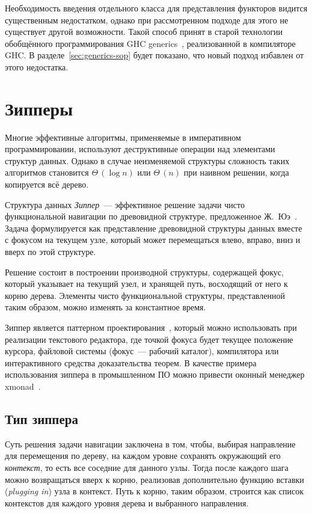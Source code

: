 Необходимость введения отдельного класса для представления
функторов видится существенным недостатком, однако при
рассмотренном подходе для этого не существует другой возможности.
Такой способ принят в старой технологии обобщённого
программирования \textsf{GHC generics}~\cite{ghc-generics},
реализованной в компиляторе \textsf{GHC}. В
разделе~\ref{sec:generics-sop} будет показано, что новый подход
избавлен от этого недостатка.

\section{Зипперы}
\label{sec:zippers}

Многие эффективные алгоритмы, применяемые в императивном программировании, используют деструктивные операции над элементами структур данных. Однако в случае неизменяемой структуры сложность таких алгоритмов становится $\Theta\,(\log n)$ или $\Theta\,(n)$ при наивном решении, когда копируется всё дерево.

Структура данных \emph{Зиппер}~--- эффективное решение задачи чисто функциональной навигации по древовидной структуре, предложенное Ж.~Юэ~\cite{Hue1997}. Задача формулируется как представление древовидной структуры данных вместе с фокусом на текущем узле, который может перемещаться влево, вправо, вниз и вверх по этой структуре.

Решение состоит в построении производной структуры, содержащей фокус, который указывает на текущий узел, и хранящей путь, восходящий от него к корню дерева. Элементы чисто функциональной структуры, представленной таким образом, можно изменять за константное время.

Зиппер является паттерном проектирования~\cite{Ad2010}, который можно использовать при реализации текстового редактора, где точкой фокуса будет текущее положение курсора, файловой системы (фокус~--- рабочий каталог), компилятора или интерактивного средства доказательства теорем. В качестве примера использования зиппера в промышленном ПО можно привести оконный менеджер \textsf{xmonad}~\cite{xmonad}.

\subsection{Тип зиппера}

Суть решения задачи навигации заключена в том, чтобы, выбирая направление для перемещения по дереву, на каждом уровне сохранять окружающий его \emph{контекст}, то есть все соседние для данного узлы. Тогда после каждого шага можно возвращаться вверх к корню, реализовав дополнительно функцию вставки (\textsl{plugging in}) узла в контекст. Путь к корню, таким образом, строится как список контекстов для каждого уровня дерева и выбранного направления.

